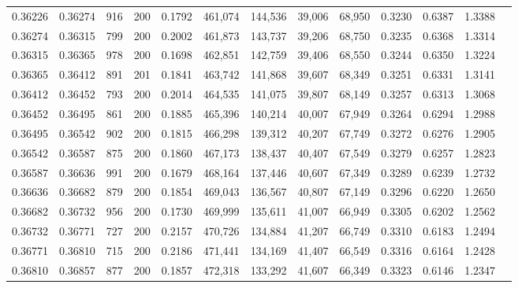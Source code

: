 \begin{tabular}{rrrrrrrrrrrrr}
0.36226 & 0.36274 &    916 & 200 &                                     0.1792 & 461,074 & 144,536 &  39,006 &  68,950 & 0.3230 & 0.6387 & 1.3388 \\
0.36274 & 0.36315 &    799 & 200 &                                     0.2002 & 461,873 & 143,737 &  39,206 &  68,750 & 0.3235 & 0.6368 & 1.3314 \\
0.36315 & 0.36365 &    978 & 200 &                                     0.1698 & 462,851 & 142,759 &  39,406 &  68,550 & 0.3244 & 0.6350 & 1.3224 \\
0.36365 & 0.36412 &    891 & 201 &                                     0.1841 & 463,742 & 141,868 &  39,607 &  68,349 & 0.3251 & 0.6331 & 1.3141 \\
0.36412 & 0.36452 &    793 & 200 &                                     0.2014 & 464,535 & 141,075 &  39,807 &  68,149 & 0.3257 & 0.6313 & 1.3068 \\
0.36452 & 0.36495 &    861 & 200 &                                     0.1885 & 465,396 & 140,214 &  40,007 &  67,949 & 0.3264 & 0.6294 & 1.2988 \\
0.36495 & 0.36542 &    902 & 200 &                                     0.1815 & 466,298 & 139,312 &  40,207 &  67,749 & 0.3272 & 0.6276 & 1.2905 \\
0.36542 & 0.36587 &    875 & 200 &                                     0.1860 & 467,173 & 138,437 &  40,407 &  67,549 & 0.3279 & 0.6257 & 1.2823 \\
0.36587 & 0.36636 &    991 & 200 &                                     0.1679 & 468,164 & 137,446 &  40,607 &  67,349 & 0.3289 & 0.6239 & 1.2732 \\
0.36636 & 0.36682 &    879 & 200 &                                     0.1854 & 469,043 & 136,567 &  40,807 &  67,149 & 0.3296 & 0.6220 & 1.2650 \\
0.36682 & 0.36732 &    956 & 200 &                                     0.1730 & 469,999 & 135,611 &  41,007 &  66,949 & 0.3305 & 0.6202 & 1.2562 \\
0.36732 & 0.36771 &    727 & 200 &                                     0.2157 & 470,726 & 134,884 &  41,207 &  66,749 & 0.3310 & 0.6183 & 1.2494 \\
0.36771 & 0.36810 &    715 & 200 &                                     0.2186 & 471,441 & 134,169 &  41,407 &  66,549 & 0.3316 & 0.6164 & 1.2428 \\
0.36810 & 0.36857 &    877 & 200 &                                     0.1857 & 472,318 & 133,292 &  41,607 &  66,349 & 0.3323 & 0.6146 & 1.2347 \\

\end{tabular}
